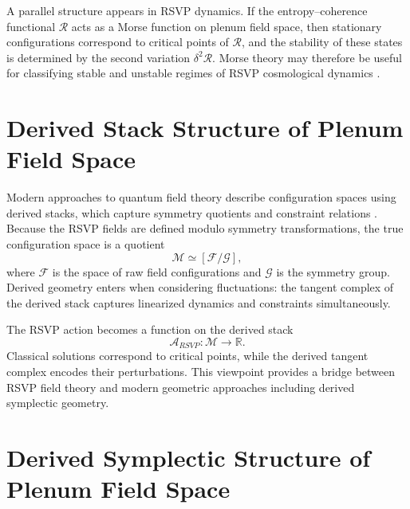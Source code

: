 \documentclass[12pt,a4paper]{article}
\theoremstyle{plain}
\theoremstyle{definition}
\theoremstyle{remark}
\begin{document}
A parallel structure appears in RSVP dynamics. If the
entropy--coherence functional $\mathcal{R}$ acts as a Morse function
on plenum field space, then stationary configurations correspond to
critical points of $\mathcal{R}$, and the stability of these states
is determined by the second variation $\delta^2\mathcal{R}$.
Morse theory may therefore be useful for classifying stable and
unstable regimes of RSVP cosmological dynamics
\cite{Nakahara,Frankel}.

\section{Derived Stack Structure of Plenum Field Space}

Modern approaches to quantum field theory describe configuration spaces
using derived stacks, which capture symmetry quotients and constraint
relations \cite{LurieTFT,CostelloGwilliam,Kontsevich2003}. Because
the RSVP fields are defined modulo symmetry transformations, the true
configuration space is a quotient
\begin{equation}
\mathcal{M} \simeq [\mathcal{F}/\mathcal{G}],
\end{equation}
where $\mathcal{F}$ is the space of raw field configurations and
$\mathcal{G}$ is the symmetry group. Derived geometry enters when
considering fluctuations: the tangent complex of the derived stack
captures linearized dynamics and constraints simultaneously.

The RSVP action becomes a function on the derived stack
\begin{equation}
\mathcal{A}_{RSVP} : \mathcal{M} \rightarrow \mathbb{R}.
\end{equation}
Classical solutions correspond to critical points, while the derived
tangent complex encodes their perturbations. This viewpoint provides
a bridge between RSVP field theory and modern geometric approaches
including derived symplectic geometry.

\section{Derived Symplectic Structure of Plenum Field Space}
\end{document}
